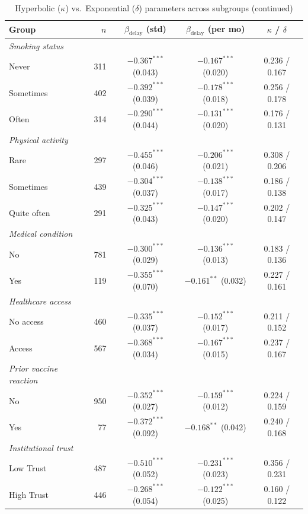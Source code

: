 \documentclass[doublespacing]{utdthesis}
\begin{document}
\begin{table}[!htbp]
\ContinuedFloat
\centering
\caption[]{Hyperbolic ($\kappa$) vs.\ Exponential ($\delta$) parameters across subgroups (continued)}
\begin{threeparttable}
\setlength{\tabcolsep}{6pt}
\begin{tabular}{l r c c c}
\toprule
Group & $n$ & $\beta_{\text{delay}}$ (std) & $\beta_{\text{delay}}$ (per mo) & $\kappa$ / $\delta$ \\
\midrule
\textit{Smoking status} \\
\quad Never     & 311 & $-0.367^{***}$ (0.043) & $-0.167^{***}$ (0.020) & 0.236 / 0.167 \\
\quad Sometimes & 402 & $-0.392^{***}$ (0.039) & $-0.178^{***}$ (0.018) & 0.256 / 0.178 \\
\quad Often     & 314 & $-0.290^{***}$ (0.044) & $-0.131^{***}$ (0.020) & 0.176 / 0.131 \\
\addlinespace
\textit{Physical activity} \\
\quad Rare        & 297 & $-0.455^{***}$ (0.046) & $-0.206^{***}$ (0.021) & 0.308 / 0.206 \\
\quad Sometimes   & 439 & $-0.304^{***}$ (0.037) & $-0.138^{***}$ (0.017) & 0.186 / 0.138 \\
\quad Quite often & 291 & $-0.325^{***}$ (0.043) & $-0.147^{***}$ (0.020) & 0.202 / 0.147 \\
\addlinespace
\textit{Medical condition} \\
\quad No  & 781 & $-0.300^{***}$ (0.029) & $-0.136^{***}$ (0.013) & 0.183 / 0.136 \\
\quad Yes & 119 & $-0.355^{***}$ (0.070) & $-0.161^{**}$  (0.032) & 0.227 / 0.161 \\
\addlinespace
\textit{Healthcare access} \\
\quad No access & 460 & $-0.335^{***}$ (0.037) & $-0.152^{***}$ (0.017) & 0.211 / 0.152 \\
\quad Access    & 567 & $-0.368^{***}$ (0.034) & $-0.167^{***}$ (0.015) & 0.237 / 0.167 \\
\addlinespace
\textit{Prior vaccine reaction} \\
\quad No  & 950 & $-0.352^{***}$ (0.027) & $-0.159^{***}$ (0.012) & 0.224 / 0.159 \\
\quad Yes & 77  & $-0.372^{***}$ (0.092) & $-0.168^{**}$  (0.042) & 0.240 / 0.168 \\
\addlinespace
\textit{Institutional trust} \\
\quad Low Trust  & 487 & $-0.510^{***}$ (0.052) & $-0.231^{***}$ (0.023) & 0.356 / 0.231 \\
\quad High Trust & 446 & $-0.268^{***}$ (0.054) & $-0.122^{***}$ (0.025) & 0.160 / 0.122 \\
\bottomrule
\end{tabular}
\end{threeparttable}
\end{table}
\end{document}
